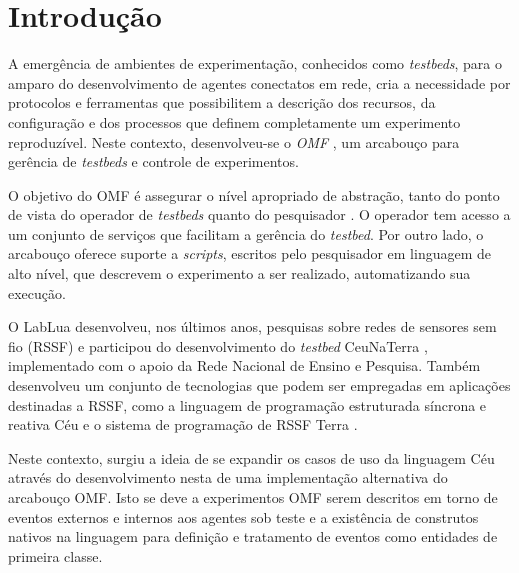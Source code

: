 
\chapter{Introdu\c{c}\~ao}

A emerg\^encia de ambientes de experimenta\c{c}\~ao, conhecidos como \textit{testbeds}, para o amparo do desenvolvimento de agentes conectatos em rede, cria a necessidade por protocolos e ferramentas que possibilitem a descri\c{c}\~ao dos recursos, da configura\c{c}\~ao e dos processos que definem completamente um experimento reproduz\'ivel. Neste contexto, desenvolveu-se o \textit{OMF} \cite{Rakotoarivelo2010:OCM:1713254.1713267}, um arcabou\c{c}o para ger\^encia de \textit{testbeds} e controle de experimentos.

O objetivo do OMF \'e assegurar o n\'ivel apropriado de abstra\c{c}\~ao, tanto do ponto de vista do operador de \textit{testbeds} quanto do pesquisador \cite{OMFExecutiveSummary}. O operador tem acesso a um conjunto de servi\c{c}os que facilitam a ger\^encia do \textit{testbed}. Por outro lado, o arcabou\c{c}o oferece suporte a \textit{scripts}, escritos pelo pesquisador em linguagem de alto n\'ivel, que descrevem o experimento a ser realizado, automatizando sua execu\c{c}\~ao.

O LabLua desenvolveu, nos \'ultimos anos, pesquisas sobre redes de sensores sem fio (RSSF) e participou do desenvolvimento do \textit{testbed} CeuNaTerra \cite{rossettoceunaterra}, implementado com o apoio da Rede Nacional de Ensino e Pesquisa. Também desenvolveu um conjunto de tecnologias que podem ser empregadas em aplica\c{c}\~oes destinadas a RSSF, como a linguagem de programa\c{c}\~ao estruturada s\'incrona e reativa C\'eu \cite{ceu.tr} e o sistema de programa\c{c}\~ao de RSSF Terra \cite{Branco:2015:TFS:2782756.2811267}. 

Neste contexto, surgiu a ideia de se expandir os casos de uso da linguagem C\'eu atrav\'es do desenvolvimento nesta de uma implementa\c{c}\~ao alternativa do arcabou\c{c}o OMF. Isto se deve a experimentos OMF serem descritos em torno de eventos externos e internos aos agentes sob teste e a exist\^encia de construtos nativos na linguagem para defini\c{c}\~ao e tratamento de eventos como entidades de primeira classe.

